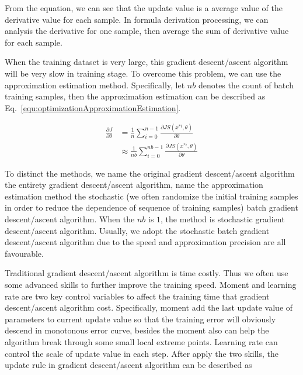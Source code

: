 \documentclass[runningheads,openany]{xhlPaper}
\begin{document}
From the equation, we can see that the update value is a average value of the derivative value for each sample. In formula derivation processing, we can analysis the derivative for one sample, then average the sum of derivative value for each sample.

When the training dataset is very large, this gradient descent/ascent algorithm will be very slow in training stage. To overcome this problem, we can use the approximation estimation method. Specifically, let $nb$ denotes the count of batch training samples, then the approximation estimation can be described as Eq.~\ref{equ:optimizationApproximationEstimation}.

\begin{equation}
\label{equ:optimizationApproximationEstimation}
\begin{aligned}
\frac{{\partial J}}{{\partial \theta }} &= \frac{1}{n}\sum\limits_{i = 0}^{n - 1} {\frac{{\partial JS\left( {{x^{ * i}},\theta } \right)}}{{\partial \theta }}} \\
 &\approx \frac{1}{{nb}}\sum\limits_{i = 0}^{nb - 1} {\frac{{\partial JS\left( {{x^{ * i}},\theta } \right)}}{{\partial \theta }}} 
\end{aligned}
\end{equation}

To distinct the methods, we name the original gradient descent/ascent algorithm the entirety gradient descent/ascent algorithm, name the approximation estimation method the stochastic (we often randomize the initial training samples in order to reduce the dependence of sequence of training samples) batch gradient descent/ascent algorithm. When the $nb$ is $1$, the method is stochastic gradient descent/ascent algorithm. Usually, we adopt the stochastic batch gradient descent/ascent algorithm due to the speed and approximation precision are all favourable.

Traditional gradient descent/ascent algorithm is time costly. Thus we often use some advanced skills to further improve the training speed. Moment and learning rate are two key control variables to affect the training time that gradient descent/ascent algorithm cost. Specifically, moment add the last update value of parameters to current update value so that the training error will obviously descend in monotonous error curve, besides the moment also can help the algorithm break through some small local extreme points. Learning rate can control the scale of update value in each step. After apply the two skills, the update rule in gradient descent/ascent algorithm can be described as
\end{document}

